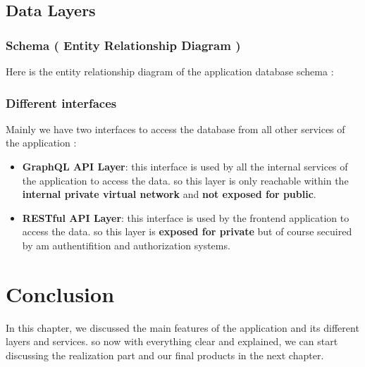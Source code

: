 \subsection{Data Layers}
\subsubsection{Schema ( Entity Relationship Diagram )}
Here is the entity relationship diagram of the application database schema :
\newpage
\subsubsection{Different interfaces}
Mainly we have two interfaces to access the database from all other services of the application :
\begin{itemize}
  \item \textbf{GraphQL API Layer}: this interface is used by all the internal services of the application to access the data. so this layer is only reachable within the \textbf{internal private virtual network} and \textbf{not exposed for public}.
  \item \textbf{RESTful API Layer}: this interface is used by the frontend application to access the data. so this layer is \textbf{ exposed for private} but of course secuired by am authentifition and authorization systems.
\end{itemize}
\newpage
\setcounter{secnumdepth}{0} %
\section{Conclusion}
In this chapter, we discussed the main features of the application and its different layers and services. so now with everything clear and explained, we can start discussing the realization part and our final products in the next chapter.
